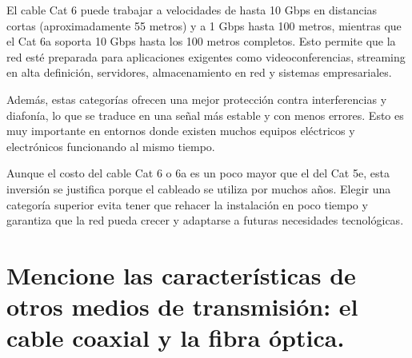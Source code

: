 \documentclass[a4paper,12pt]{article}
\begin{document}
El cable Cat 6 puede trabajar a velocidades de hasta 10 Gbps en distancias cortas
(aproximadamente 55 metros) y a 1 Gbps hasta 100 metros, mientras que el Cat 6a soporta
10 Gbps hasta los 100 metros completos. Esto permite que la red esté preparada para
aplicaciones exigentes como videoconferencias, streaming en alta definición, servidores,
almacenamiento en red y sistemas empresariales.

Además, estas categorías ofrecen una mejor protección contra interferencias y diafonía, lo
que se traduce en una señal más estable y con menos errores. Esto es muy importante en
entornos donde existen muchos equipos eléctricos y electrónicos funcionando al mismo
tiempo.

Aunque el costo del cable Cat 6 o 6a es un poco mayor que el del Cat 5e, esta inversión se
justifica porque el cableado se utiliza por muchos años. Elegir una categoría superior evita
tener que rehacer la instalación en poco tiempo y garantiza que la red pueda crecer y
adaptarse a futuras necesidades tecnológicas.

\newpage
\section{Mencione las características de otros medios de transmisión: el cable coaxial y la fibra óptica.}
\end{document}
